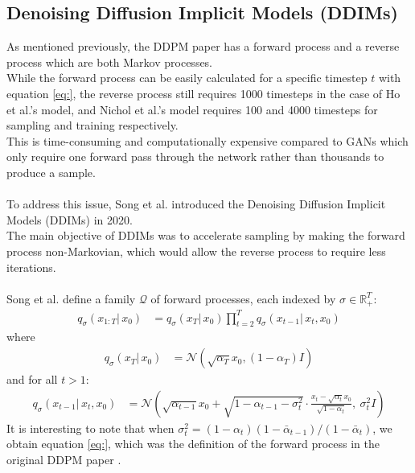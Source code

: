 \documentclass{article}
\begin{document}
\newpage

\subsection{Denoising Diffusion Implicit Models (DDIMs)}
As mentioned previously, the DDPM paper \cite{ho2020denoising} has a forward process and a reverse process which are both Markov processes. \\
While the forward process can be easily calculated for a specific timestep $t$ with equation \ref{eq:}, the reverse process still requires 1000 timesteps in the case of Ho et al.'s \cite{ho2020denoising} model, and Nichol et al.'s model requires 100 and 4000 timesteps for sampling and training respectively. \cite{nichol2021improved} \\
This is time-consuming and computationally expensive compared to GANs which only require one forward pass through the network rather than thousands to produce a sample. \cite{song2022denoising}
\\\\
To address this issue, Song et al. \cite{song2022denoising} introduced the Denoising Diffusion Implicit Models (DDIMs) in 2020. \\
The main objective of DDIMs was to accelerate sampling by making the forward process non-Markovian, which would allow the reverse process to require less iterations. \cite{song2022denoising}
\\\\
Song et al. \cite{song2022denoising} define a family $\mathcal{Q}$ of forward processes, each indexed by $\sigma \in \mathbb{R}^T_+$:
\begin{align}
  q_{\sigma}(x_{1:T}| \, x_0) &= q_{\sigma}(x_T | \, x_0) \prod_{t=2}^{T} q_{\sigma}(x_{t-1}| \, x_t, x_0)
\end{align}
where
\begin{align}
  q_{\sigma}(x_T | \, x_0) &= \mathcal{N}(\sqrt{\alpha_T} x_0, (1 - \alpha_T) I)
\end{align}
and for all $t > 1$:
\begin{align}
  q_{\sigma}(x_{t-1} | \, x_t, x_0) &= \mathcal{N}\left( \sqrt{\alpha_{t-1}} x_0 + \sqrt{1 - \alpha_{t-1} - \sigma_t^2} \cdot \frac{x_t - \sqrt{\alpha_t} x_0}{\sqrt{1 - \alpha_t}}, \: \sigma_t^2 I \right)
\end{align}
It is interesting to note that when $\sigma_t^2 = (1 - \alpha_t)(1 - \bar{\alpha}_{t-1})/(1 - \bar{\alpha}_t)$, we obtain equation \ref{eq:}, which was the definition of the forward process in the original DDPM paper \cite{ho2020denoising, song2022denoising}. \\
\end{document}
